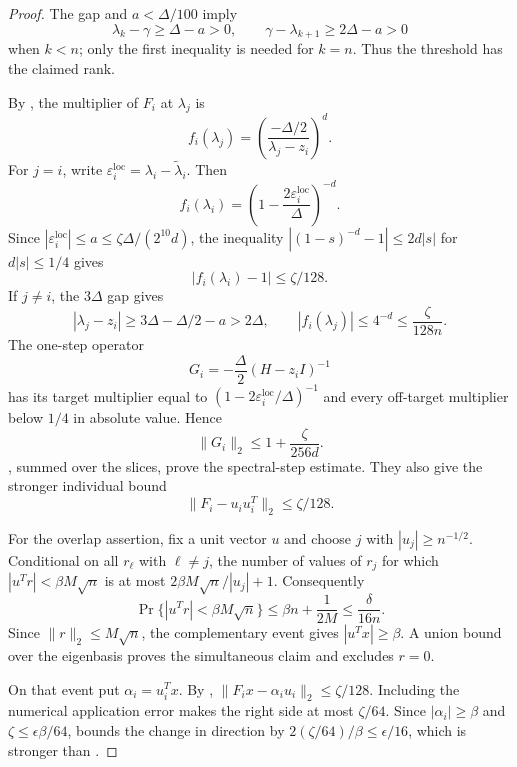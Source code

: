 \documentclass[11pt]{article}
\begin{document}
\begin{proof}
The gap and $a<\Delta/100$ imply
\[
 \lambda_k-\gamma\geq\Delta-a>0,
 \qquad
 \gamma-\lambda_{k+1}\geq2\Delta-a>0
\]
when $k<n$; only the first inequality is needed for $k=n$.  Thus the
threshold has the claimed rank.

By , the multiplier of $F_i$ at $\lambda_j$ is
\begin{equation}
 \label{eq:filter-multiplier}
 f_i(\lambda_j)=
 \left(\frac{-\Delta/2}{\lambda_j-z_i}\right)^d.
\end{equation}
For $j=i$, write
$\varepsilon_i^{\mathrm{loc}}=\lambda_i-\widetilde\lambda_i$.  Then
\[
 f_i(\lambda_i)=
 \left(1-\frac{2\varepsilon_i^{\mathrm{loc}}}{\Delta}\right)^{-d}.
\]
Since $|\varepsilon_i^{\mathrm{loc}}|\leq a
\leq\zeta\Delta/(2^{10}d)$, the inequality
$|(1-s)^{-d}-1|\leq2d|s|$ for $d|s|\leq1/4$ gives
\begin{equation}
 \label{eq:on-target-filter}
 |f_i(\lambda_i)-1|\leq\zeta/128.
\end{equation}
If $j\ne i$, the $3\Delta$ gap gives
\[
 |\lambda_j-z_i|\geq3\Delta-\Delta/2-a>2\Delta,
 \qquad
 |f_i(\lambda_j)|\leq4^{-d}\leq\frac{\zeta}{128n}.
\]
The one-step operator
\[
 G_i=-\frac\Delta2(H-z_iI)^{-1}
\]
has its target multiplier equal to
$(1-2\varepsilon_i^{\mathrm{loc}}/\Delta)^{-1}$ and every off-target
multiplier below $1/4$ in absolute value.  Hence
\begin{equation}
 \label{eq:filter-power-bound}
 \lVert G_i\rVert_2\leq1+\frac{\zeta}{256d}.
\end{equation}
, summed
over the slices, prove the spectral-step estimate.  They also give the
stronger individual bound
\begin{equation}
 \label{eq:rank-one-filter}
 \lVert F_i-u_iu_i^T\rVert_2\leq\zeta/128.
\end{equation}

For the overlap assertion, fix a unit vector $u$ and choose $j$ with
$|u_j|\geq n^{-1/2}$.  Conditional on all $r_\ell$ with $\ell\ne j$, the
number of values of $r_j$ for which
$|u^Tr|<\beta M\sqrt n$ is at most
$2\beta M\sqrt n/|u_j|+1$.  Consequently
\[
 \Pr\{|u^Tr|<\beta M\sqrt n\}
 \leq\beta n+\frac1{2M}
 \leq\frac\delta{16n}.
\]
Since $\lVert r\rVert_2\leq M\sqrt n$, the complementary event gives
$|u^Tx|\geq\beta$.  A union bound over the eigenbasis proves the simultaneous
claim and excludes $r=0$.

On that event put $\alpha_i=u_i^Tx$.  By
,
$\lVert F_ix-\alpha_iu_i\rVert_2\leq\zeta/128$.  Including the numerical
application error makes the right side at most $\zeta/64$.  Since
$|\alpha_i|\geq\beta$ and $\zeta\leq\epsilon\beta/64$,
 bounds the change in direction by
$2(\zeta/64)/\beta\leq\epsilon/16$, which is stronger than
.
\end{proof}
\end{document}
